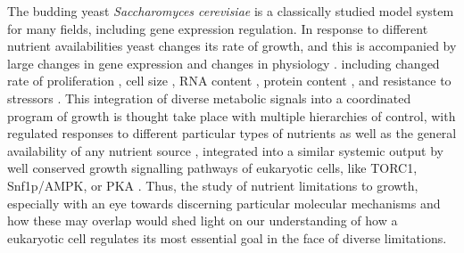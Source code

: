 The budding yeast \textit{Saccharomyces cerevisiae} is a
classically studied model system for many fields, including gene
expression regulation. In response to different nutrient 
availabilities yeast changes its rate of growth, and
this is accompanied by large changes in gene expression 
\parencite{brauer2008coordination,conway2012glucose}
and changes in physiology 
\parencite{waldron1977synthesis,carter1978protein}.
including changed rate of proliferation \parencite{slator1918some}, 
cell size \parencite{jorgensen2004dynamic},
RNA content \parencite{waldron1975effect}, 
protein content \parencite{kief1981coordinate},
and resistance to stressors \parencite{elliott1993stress}.
This integration of diverse metabolic signals into a coordinated 
program of growth is thought take place with multiple hierarchies of 
control, with regulated responses to different particular 
types of nutrients as well as the general availability of any 
nutrient source 
\parencite{winderickx2003feast,broach2012nutritional,cooper1982nitrogen},
integrated into a similar systemic output by well conserved growth 
signalling pathways of eukaryotic cells, like TORC1, Snf1p/AMPK, 
or PKA \parencite{conrad2014nutrient,thevelein1994signal}.
Thus, the study of nutrient limitations to growth, especially with 
an eye towards discerning particular molecular mechanisms 
\parencite{oliveira2015dynamic,oliveira2015inferring,tate2017general,stracka2014nitrogen,peli2015amino} 
and how these may overlap would shed light on our understanding of
how a eukaryotic cell regulates its most essential goal in the face of
diverse limitations.

